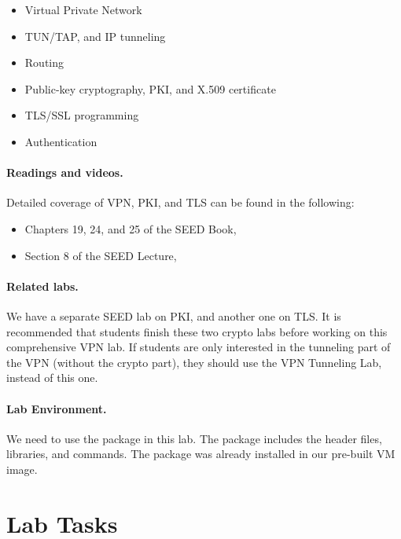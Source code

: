 \begin{itemize}[noitemsep]
\item Virtual Private Network
\item TUN/TAP, and IP tunneling 
\item Routing
\item Public-key cryptography, PKI, and X.509 certificate
\item TLS/SSL programming
\item Authentication
\end{itemize}


\paragraph{Readings and videos.}
Detailed coverage of VPN, PKI, and TLS can be found in the following:

\begin{itemize}
\item Chapters 19, 24, and 25 of the SEED Book, \seedbook
\item Section 8 of the SEED Lecture, \seedisvideo
\end{itemize}


\paragraph{Related labs.}
We have a separate SEED lab on PKI, and another one on TLS. 
It is recommended that students finish these
two crypto labs before working on this comprehensive VPN lab. If 
students are only interested in the tunneling part of the VPN (without
the crypto part), they should use the VPN Tunneling Lab, instead 
of this one.


\paragraph{Lab Environment.} 
\seedenvironmentB
We need to use the \openssl package in this lab. The package includes
the header files, libraries, and commands. The package was 
already installed in our pre-built VM image. 





\newpage
\section{Lab Tasks}

